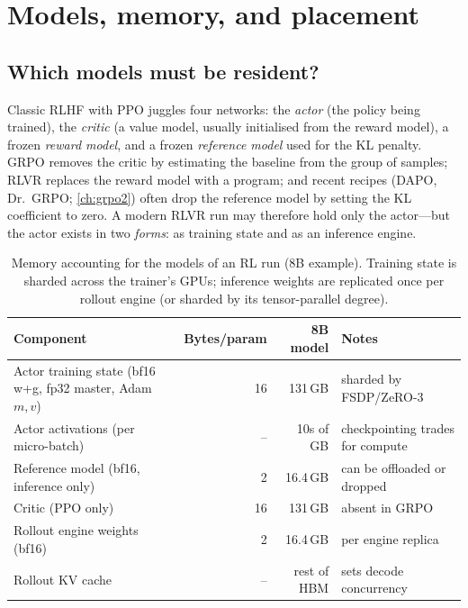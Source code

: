 \section{Models, memory, and placement}\label{sec:rlsys:placement}

\subsection{Which models must be resident?}

Classic RLHF with PPO juggles four networks: the \emph{actor} (the policy being trained), the
\emph{critic} (a value model, usually initialised from the reward model), a frozen
\emph{reward model}, and a frozen \emph{reference model} used for the KL penalty. GRPO removes
the critic by estimating the baseline from the group of samples; RLVR replaces the reward
model with a program; and recent recipes (DAPO, Dr.~GRPO; \cref{ch:grpo2}) often drop the
reference model by setting the KL coefficient to zero. A modern RLVR run may therefore hold
only the actor---but the actor exists in two \emph{forms}: as training state and as an
inference engine.

\begin{table}[t]
\centering\small
\begin{tabularx}{\linewidth}{@{}>{\raggedright\arraybackslash}Xrr>{\raggedright\arraybackslash}p{3.6cm}@{}}
\toprule
Component & Bytes/param & 8B model & Notes\\
\midrule
Actor training state (bf16 w+g, fp32 master, Adam $m,v$) & 16 & 131\,GB & sharded by FSDP/ZeRO-3\\
Actor activations (per micro-batch) & -- & 10s of GB & checkpointing trades for compute\\
Reference model (bf16, inference only) & 2 & 16.4\,GB & can be offloaded or dropped\\
Critic (PPO only) & 16 & 131\,GB & absent in GRPO\\
Rollout engine weights (bf16) & 2 & 16.4\,GB & per engine replica\\
Rollout KV cache & -- & rest of HBM & sets decode concurrency\\
\bottomrule
\end{tabularx}
\caption{Memory accounting for the models of an RL run (8B example). Training state is
sharded across the trainer's GPUs; inference weights are replicated once per rollout engine
(or sharded by its tensor-parallel degree).}
\label{tab:rlsys:memory}
\end{table}

